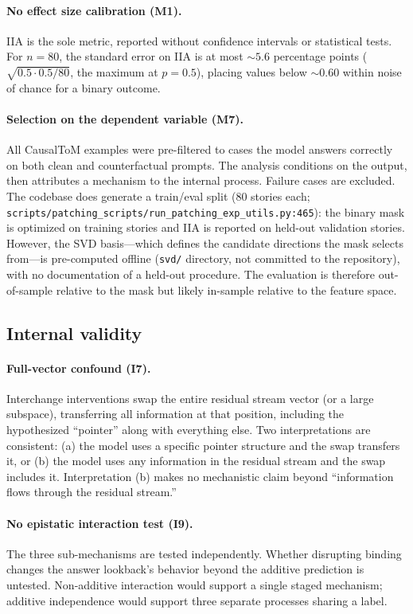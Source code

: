\documentclass{article}
\begin{document}
\paragraph{No effect size calibration (M1).}
IIA is the sole metric, reported without confidence intervals or statistical tests. For $n = 80$, the standard error on IIA is at most ${\sim}5.6$ percentage points ($\sqrt{0.5 \cdot 0.5 / 80}$, the maximum at $p = 0.5$), placing values below ${\sim}0.60$ within noise of chance for a binary outcome.

\paragraph{Selection on the dependent variable (M7).}
All CausalToM examples were pre-filtered to cases the model answers correctly on both clean and counterfactual prompts. The analysis conditions on the output, then attributes a mechanism to the internal process. Failure cases are excluded. The codebase does generate a train/eval split (80 stories each; \texttt{scripts/patching\_scripts/run\_patching\_exp\_utils.py:465}): the binary mask is optimized on training stories and IIA is reported on held-out validation stories. However, the SVD basis---which defines the candidate directions the mask selects from---is pre-computed offline (\texttt{svd/} directory, not committed to the repository), with no documentation of a held-out procedure. The evaluation is therefore out-of-sample relative to the mask but likely in-sample relative to the feature space.

\subsection{Internal validity}

\paragraph{Full-vector confound (I7).}
Interchange interventions swap the entire residual stream vector (or a large subspace), transferring all information at that position, including the hypothesized ``pointer'' along with everything else. Two interpretations are consistent: (a) the model uses a specific pointer structure and the swap transfers it, or (b) the model uses any information in the residual stream and the swap includes it. Interpretation (b) makes no mechanistic claim beyond ``information flows through the residual stream.''

\paragraph{No epistatic interaction test (I9).}
The three sub-mechanisms are tested independently. Whether disrupting binding changes the answer lookback's behavior beyond the additive prediction is untested. Non-additive interaction would support a single staged mechanism; additive independence would support three separate processes sharing a label.
\end{document}
